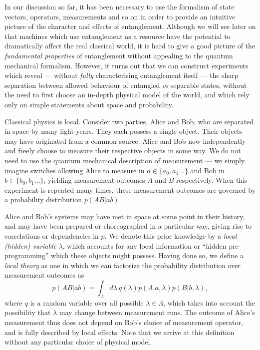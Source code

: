 In our discussion so far, it has been necessary to use the formalism of state vectors, operators, measurements and so on in order to provide an intuitive picture of the character and effects of entanglement. Although we will see later on that machines which use entanglement as a resource have the potential to dramatically affect the real classical world, it is hard to give a good picture of the \emph{fundamental properties} of entanglement without appealing to the quantum mechanical formalism. However, it turns out that we can construct experiments which reveal --- without \emph{fully} characterising entanglement itself --- the sharp separation between allowed behaviour of entangled \emph{vs} separable states, without the need to first choose an in-depth physical model of the world, and which rely only on simple statements about space and probability.

Classical physics is local. Consider two parties, Alice and Bob, who are separated in space by many light-years. They each possess a single object. Their objects may have originated from a common source. Alice and Bob now independently and freely choose to measure their respective objects in some way. We do not need to use the quantum mechanical description of measurement --- we simply imagine switches allowing Alice to measure in $a \in \{a_0, a_1 \ldots \}$ and Bob in $b \in \{b_0, b_1 \ldots \}$, yielding measurement outcomes $A$ and $B$ respectively. When this experiment is repeated many times, these measurement outcomes are governed by a probability distribution $p(AB|ab)$.

Alice and Bob's systems may have met in space at some point in their history, and may have been prepared or choreographed in a particular way, giving rise to correlations or dependencies in $p$. We denote this prior knowledge by a \emph{local (hidden) variable} $\lambda$, which accounts for any local information or ``hidden pre-programming'' which these objects might possess. Having done so, we define a \emph{local theory} as one in which we can factorize the probability distribution \cite{Brunner2013} over measurement outcomes as 
\begin{equation}
p(AB|ab) = \int_\Lambda d\lambda ~q(\lambda) p(A|a, \lambda) p(B|b, \lambda),
\label{eqn:locality}
\end{equation}
where $q$ is a random variable over all possible $\lambda \in \Lambda$, which takes into account the possibility that $\lambda$ may change between measurement runs.
The outcome of Alice's measurement thus does not depend on Bob's choice of measurement operator, and is fully described by local effects. Note that we arrive at this definition without any particular choice of physical model.

